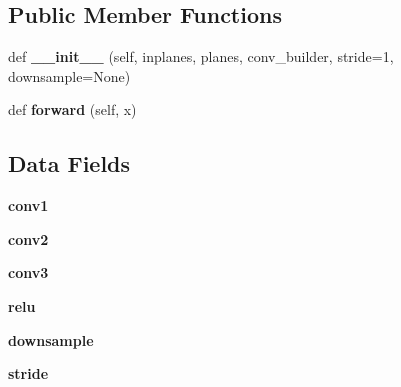 \subsection*{Public Member Functions}
\begin{DoxyCompactItemize}
\item 
\mbox{\label{classtorchvision_1_1models_1_1video_1_1resnet_1_1Bottleneck_a08ddf8452cd9f911004310d39e03bc6d}} 
def {\bfseries \+\_\+\+\_\+init\+\_\+\+\_\+} (self, inplanes, planes, conv\+\_\+builder, stride=1, downsample=None)
\item 
\mbox{\label{classtorchvision_1_1models_1_1video_1_1resnet_1_1Bottleneck_a1883c1795c6f1d43d2fe6030ccc45463}} 
def {\bfseries forward} (self, x)
\end{DoxyCompactItemize}
\subsection*{Data Fields}
\begin{DoxyCompactItemize}
\item 
\mbox{\label{classtorchvision_1_1models_1_1video_1_1resnet_1_1Bottleneck_ada7174d5f9bc7adc67d845123736a11c}} 
{\bfseries conv1}
\item 
\mbox{\label{classtorchvision_1_1models_1_1video_1_1resnet_1_1Bottleneck_a70646a242d0bd9cabf5b594eb01e043a}} 
{\bfseries conv2}
\item 
\mbox{\label{classtorchvision_1_1models_1_1video_1_1resnet_1_1Bottleneck_a53c7014a367822800353df8f6cf79ece}} 
{\bfseries conv3}
\item 
\mbox{\label{classtorchvision_1_1models_1_1video_1_1resnet_1_1Bottleneck_a94c64c4a5dd6701c1d229b397622bdde}} 
{\bfseries relu}
\item 
\mbox{\label{classtorchvision_1_1models_1_1video_1_1resnet_1_1Bottleneck_a74ebdb54630d8d14dc22107d174c223b}} 
{\bfseries downsample}
\item 
\mbox{\label{classtorchvision_1_1models_1_1video_1_1resnet_1_1Bottleneck_a484e673db623f7f891ab2503294d6802}} 
{\bfseries stride}
\end{DoxyCompactItemize}
